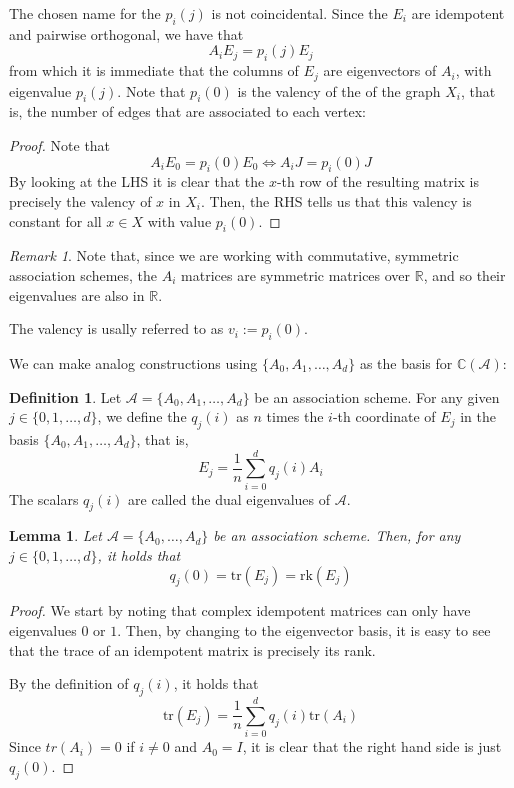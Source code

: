 \documentclass[a4paper,12pt]{article}
\theoremstyle{plain}
\newtheorem{lemma}[theorem]{Lemma}
\theoremstyle{definition}
\newtheorem{definition}[theorem]{Definition}
\theoremstyle{remark}
\newtheorem{remark}[theorem]{Remark}
\begin{document}
The chosen name for the $ p_i(j) $ is not coincidental. Since the $ E_i $ are
idempotent and pairwise orthogonal, we have that
\[ A_iE_j = p_i(j)E_j \]
from which it is immediate that the columns of $ E_j $ are eigenvectors of
$ A_i $, with eigenvalue $ p_i(j) $. Note that $ p_i(0) $ is the valency of the
of the graph $ X_i $, that is, the number of edges that are associated to each
vertex:
\begin{proof}
    Note that
    \[ A_i E_0 = p_i(0) E_0 \iff A_i J = p_i(0) J \]
    By looking at the LHS it is clear that the $ x $-th row of the resulting
    matrix is precisely the valency of $ x $ in $ X_i $. Then, the RHS tells us that this
    valency is constant for all $ x \in X $ with value $ p_i(0) $.
\end{proof}
\begin{remark}
    Note that, since we are working with commutative, symmetric association
    schemes, the $ A_i $ matrices are symmetric matrices over $ \mathbb{R} $,
    and so their eigenvalues are also in $ \mathbb{R} $.
\end{remark}
The valency is usally referred to as $ v_i := p_i(0) $.

We can make analog constructions using $ \{ A_0, A_1, \dots, A_d \} $ as the
basis for $ \mathbb{C}(\mathcal{A}) $:

\begin{definition}
    Let $ \mathcal{A} = \{ A_0, A_1, \dots, A_d \} $ be an association scheme.
    For any given $ j \in \{ 0,1,\dots,d \} $, we define the $ q_j(i) $ as $ n $
    times the $ i $-th coordinate of $ E_j $ in the basis
    $ \{ A_0, A_1, \dots, A_d \} $, that is,
    \[ E_j = \frac{1}{n} \sum_{ i=0 }^{ d } q_j(i)A_i \]
    The scalars $ q_j(i) $ are called the dual eigenvalues of $ \mathcal{A} $.
\end{definition}

\begin{lemma}
    Let $ \mathcal{A} = \{ A_0,\dots,A_d \} $ be an association scheme. Then,
    for any $ j \in \{ 0,1,\dots,d \} $, it holds that
    \[ q_j(0) = \text{tr}(E_j) = \text{rk}(E_j) \]
\end{lemma}
\begin{proof}
    We start by noting that complex idempotent matrices can only have eigenvalues $ 0 $
    or $ 1 $. Then, by changing to the eigenvector basis, it is easy to see that
    the trace of an idempotent matrix is precisely its rank.

    By the definition of $ q_j(i) $, it holds that
    \[ \text{tr}(E_j) = \frac{1}{n}\sum_{ i=0 }^{ d }q_j(i)\text{tr}(A_i) \]
    Since $ tr(A_i) = 0 $ if $ i\neq 0 $ and $ A_0 = I $, it is clear that the
    right hand side is just $ q_j(0) $.
\end{proof}
\end{document}
